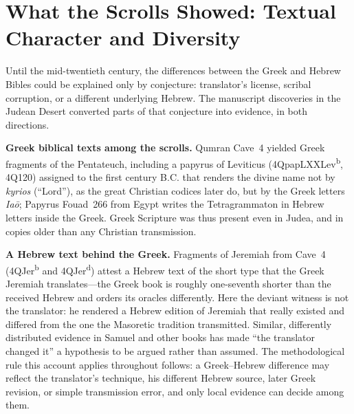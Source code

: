 \section{What the Scrolls Showed: Textual Character and Diversity}

Until the mid-twentieth century, the differences between the Greek and
Hebrew Bibles could be explained only by conjecture: translator's license,
scribal corruption, or a different underlying Hebrew. The manuscript
discoveries in the Judean Desert converted parts of that conjecture into
evidence, in both directions.

\textbf{Greek biblical texts among the scrolls.} Qumran Cave~4 yielded
Greek fragments of the Pentateuch, including a papyrus of Leviticus
(4QpapLXXLev\textsuperscript{b}, 4Q120) assigned to the first century B.C.
that renders the divine name not by \textit{kyrios} (``Lord''), as the
great Christian codices later do, but by the Greek letters \textit{Ia\=o};
Papyrus Fouad~266 from Egypt writes the Tetragrammaton in Hebrew letters
inside the Greek. Greek Scripture was thus
present even in Judea, and in copies older than any Christian transmission.

\textbf{A Hebrew text behind the Greek.} Fragments of Jeremiah from Cave~4
(4QJer\textsuperscript{b} and 4QJer\textsuperscript{d}) attest a Hebrew
text of the short type that the Greek Jeremiah translates---the Greek book
is roughly one-seventh shorter than the received Hebrew and orders its
oracles differently. Here the deviant witness is not the translator: he
rendered a Hebrew edition of Jeremiah that really existed and differed
from the one the Masoretic tradition transmitted. Similar, differently distributed evidence in Samuel and other
books has made ``the translator changed it'' a hypothesis to be argued
rather than assumed. The methodological rule this account applies
throughout follows: a Greek--Hebrew difference may reflect the translator's
technique, his different Hebrew source, later Greek revision, or simple
transmission error, and only local evidence can decide among them.

